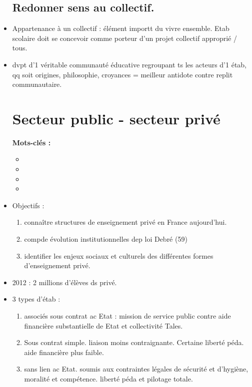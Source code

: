 \documentclass[12pt]{report}
\begin{document}
\begin{itemize}
\section{Redonner sens au collectif.}

\item Appartenance à un collectif : élément importt du vivre ensemble. Etab scolaire doit se concevoir comme porteur d'un projet collectif approprié / tous. \\

\item dvpt d'1 véritable communauté éducative regroupant ts les acteurs d'1 étab, qq soit origines, philosophie, croyances = meilleur antidote contre replit communautaire. \\


\chapter{Secteur public - secteur privé}

\textbf{Mots-clés : } 

\begin{itemize}
\item 
\item 
\item 
\item  
\end{itemize}

\item Objectifs : 
\begin{enumerate}
\item connaître structures de enseignement privé en France aujourd'hui. \\
\item compde évolution institutionnelles dep loi Debré (59)
\item identifier les enjeux sociaux et culturels des différentes formes d'enseignement privé.
\end{enumerate}

\item 2012 : 2 millions d'élèves ds privé. \\
\item 3 types d'étab : 
\begin{enumerate}
\item associés sous contrat ac Etat : mission de service public contre aide financière substantielle de Etat et collectivité Tales.\\
\item Sous contrat simple. liaison moins contraignante. Certaine liberté péda. aide financière plus faible. \\
\item sans lien ac Etat. soumis aux contraintes légales de sécurité et d'hygiène, moralité et compétence. liberté péda et pilotage totale. \\
\end{enumerate}


\end{itemize}
\end{document}
